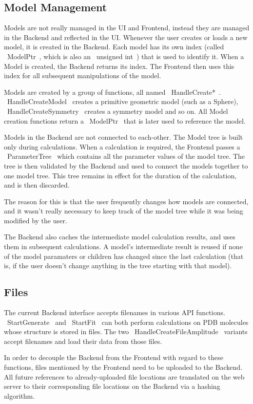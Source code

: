 \documentclass[12pt]{article}
\begin{document}
\subsection{Model Management}
Models are not really managed in the UI and Frontend, instead they are managed in the Backend and reflected in the UI. Whenever the user creates or loads a new model, it is created in the Backend. Each model has its own index (called ~ModelPtr~, which is also an ~unsigned int~) that is used to identify it. When a Model is created, the Backend returns its index. The Frontend then uses this index for all subsequent manipulations of the model.

Models are created by a group of functions, all named ~HandleCreate*~. ~HandleCreateModel~ creates a primitive geometric model (such as a Sphere), ~HandleCreateSymmetry~ creates a symmetry model and so on. All Model creation functions return a ~ModelPtr~ that is later used to reference the model.

Models in the Backend are not connected to each-other. The Model tree is built only during calculations. When a calculation is required, the Frontend passes a ~ParameterTree~ which contains all the parameter values of the model tree. The tree is then validated by the Backend and used to connect the models together to one model tree. This tree remains in effect for the duration of the calculation, and is then discarded.

The reason for this is that the user frequently changes how models are connected, and it wasn't really necessary to keep track of the model tree while it was being modified by the user.

The Backend also caches the intermediate model calculation results, and uses them in subsequent calculations. A model's intermediate result is reused if none of the model paramaters or children has changed since the last calculation (that is, if the user doesn't change anything in the tree starting with that model).

\subsection{Files}
The current Backend interface accepts filenames in various API functions. ~StartGenerate~ and ~StartFit~ can both perform calculations on PDB molecules whose structure is stored in files. The two ~HandleCreateFileAmplitude~ variants accept filenames and load their data from those files. 

In order to decouple the Backend from the Frontend with regard to these functions, files mentioned by the Frontend need to be uploaded to the Backend. All future references to already-uploaded file locations are translated on the web server to their corresponding file locations on the Backend via a hashing algorithm.
\end{document}
